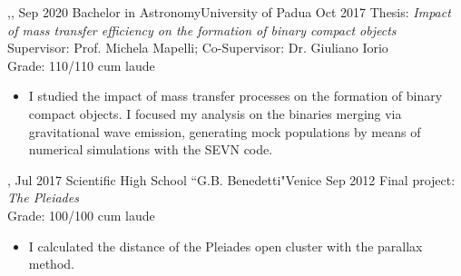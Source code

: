 \begin{experiences}
{\begin{itemize}
    \end{itemize}
    }{,,}
  \emptySeparator
  \experiencetags
    {Sep 2020}   {Bachelor in Astronomy}{University of Padua}
    {Oct 2017} 
    {Thesis: \textit{Impact of mass transfer efficiency on the formation of binary compact objects} \\
    Supervisor: Prof. Michela Mapelli; Co-Supervisor: Dr. Giuliano Iorio \\
    Grade: 110/110 cum laude  %
    }{
    \begin{itemize}
        \item  I studied the impact of mass transfer processes on the formation of binary compact objects. I focused my analysis on the binaries merging via gravitational wave emission, generating mock populations by means of numerical simulations with the SEVN code. 
   \end{itemize}
   }{,}
  \emptySeparator
    \experience
    {Jul 2017}   {Scientific High School ``G.B. Benedetti"}{Venice}
    {Sep 2012} 
    {Final project: \textit{The Pleiades} \\
    Grade: 100/100 cum laude }{    
    \begin{itemize}
        \item I calculated the distance of the Pleiades open cluster with the parallax method.
    \end{itemize}
    } 
\end{experiences}
